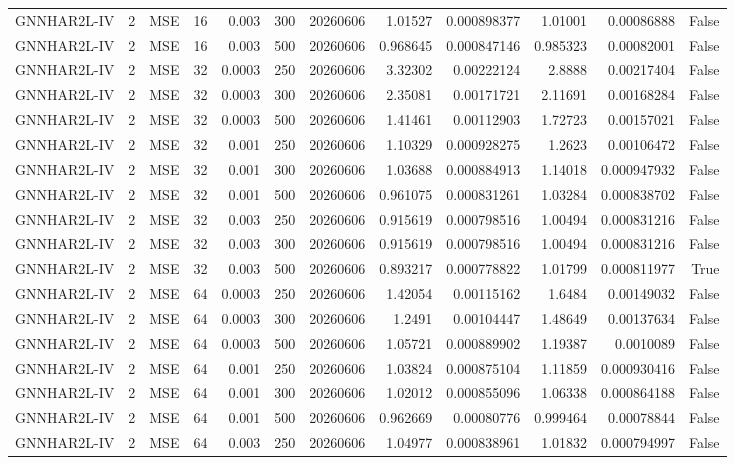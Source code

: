 \begin{tabular}{lrlrrrrrrrrr}
GNNHAR2L-IV & 2 & MSE & 16 & 0.003 & 300 & 20260606 & 1.01527 & 0.000898377 & 1.01001 & 0.00086888 & False \\
GNNHAR2L-IV & 2 & MSE & 16 & 0.003 & 500 & 20260606 & 0.968645 & 0.000847146 & 0.985323 & 0.00082001 & False \\
GNNHAR2L-IV & 2 & MSE & 32 & 0.0003 & 250 & 20260606 & 3.32302 & 0.00222124 & 2.8888 & 0.00217404 & False \\
GNNHAR2L-IV & 2 & MSE & 32 & 0.0003 & 300 & 20260606 & 2.35081 & 0.00171721 & 2.11691 & 0.00168284 & False \\
GNNHAR2L-IV & 2 & MSE & 32 & 0.0003 & 500 & 20260606 & 1.41461 & 0.00112903 & 1.72723 & 0.00157021 & False \\
GNNHAR2L-IV & 2 & MSE & 32 & 0.001 & 250 & 20260606 & 1.10329 & 0.000928275 & 1.2623 & 0.00106472 & False \\
GNNHAR2L-IV & 2 & MSE & 32 & 0.001 & 300 & 20260606 & 1.03688 & 0.000884913 & 1.14018 & 0.000947932 & False \\
GNNHAR2L-IV & 2 & MSE & 32 & 0.001 & 500 & 20260606 & 0.961075 & 0.000831261 & 1.03284 & 0.000838702 & False \\
GNNHAR2L-IV & 2 & MSE & 32 & 0.003 & 250 & 20260606 & 0.915619 & 0.000798516 & 1.00494 & 0.000831216 & False \\
GNNHAR2L-IV & 2 & MSE & 32 & 0.003 & 300 & 20260606 & 0.915619 & 0.000798516 & 1.00494 & 0.000831216 & False \\
GNNHAR2L-IV & 2 & MSE & 32 & 0.003 & 500 & 20260606 & 0.893217 & 0.000778822 & 1.01799 & 0.000811977 & True \\
GNNHAR2L-IV & 2 & MSE & 64 & 0.0003 & 250 & 20260606 & 1.42054 & 0.00115162 & 1.6484 & 0.00149032 & False \\
GNNHAR2L-IV & 2 & MSE & 64 & 0.0003 & 300 & 20260606 & 1.2491 & 0.00104447 & 1.48649 & 0.00137634 & False \\
GNNHAR2L-IV & 2 & MSE & 64 & 0.0003 & 500 & 20260606 & 1.05721 & 0.000889902 & 1.19387 & 0.0010089 & False \\
GNNHAR2L-IV & 2 & MSE & 64 & 0.001 & 250 & 20260606 & 1.03824 & 0.000875104 & 1.11859 & 0.000930416 & False \\
GNNHAR2L-IV & 2 & MSE & 64 & 0.001 & 300 & 20260606 & 1.02012 & 0.000855096 & 1.06338 & 0.000864188 & False \\
GNNHAR2L-IV & 2 & MSE & 64 & 0.001 & 500 & 20260606 & 0.962669 & 0.00080776 & 0.999464 & 0.00078844 & False \\
GNNHAR2L-IV & 2 & MSE & 64 & 0.003 & 250 & 20260606 & 1.04977 & 0.000838961 & 1.01832 & 0.000794997 & False \\

\end{tabular}
